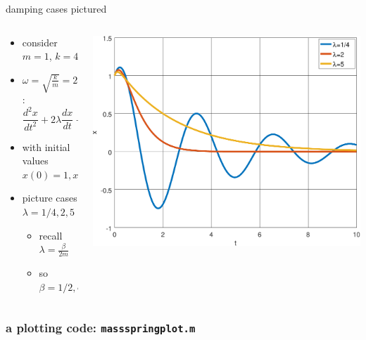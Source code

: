 \documentclass[dvipsnames,colorlinks]{beamer}
\begin{document}
\begin{frame}{damping cases pictured}

\begin{columns}
\begin{column}{0.45\textwidth}
\begin{itemize}
\item consider $m=1$, $k=4$
\item $\omega=\sqrt{\frac{k}{m}} = 2$:
    $$\frac{d^2x}{dt^2} + 2 \lambda \frac{dx}{dt} + 4 x=0$$
\item with initial values $x(0)=1,x'(0)=1$
\item picture cases $\lambda=1/4,2,5$
    \begin{itemize}
    \item recall $\lambda=\frac{\beta}{2m}$
    \item so $\beta = 1/2,4,10$
    \end{itemize}
\end{itemize}
\end{column}
\begin{column}{0.55\textwidth}
\includegraphics[width=1.03\textwidth]{figs/dampingcases}
\end{column}
\end{columns}
\end{frame}


\begin{frame}[fragile]
\frametitle{a plotting code: \texttt{massspringplot.m}}

\end{frame}
\end{document}
